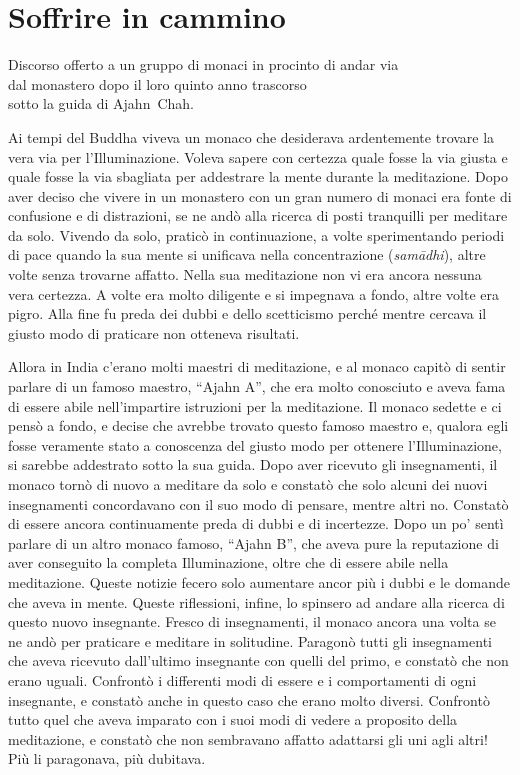 \chapter{Soffrire in cammino}

\begin{openingQuote}
  \centering

  Discorso offerto a un gruppo di monaci in procinto di andar via\\
  dal monastero dopo il loro quinto anno trascorso\\
  sotto la guida di Ajahn~Chah.
\end{openingQuote}

Ai tempi del Buddha viveva un monaco che desiderava ardentemente trovare
la vera via per l'Illuminazione. Voleva sapere con certezza quale fosse
la via giusta e quale fosse la via sbagliata per addestrare la mente
durante la meditazione. Dopo aver deciso che vivere in un monastero con
un gran numero di monaci era fonte di confusione e di distrazioni, se ne
andò alla ricerca di posti tranquilli per meditare da solo. Vivendo da
solo, praticò in continuazione, a volte sperimentando periodi di pace
quando la sua mente si unificava nella concentrazione (\emph{samādhi}),
altre volte senza trovarne affatto. Nella sua meditazione non vi era
ancora nessuna vera certezza. A volte era molto diligente e si impegnava
a fondo, altre volte era pigro. Alla fine fu preda dei dubbi e dello
scetticismo perché mentre cercava il giusto modo di praticare non
otteneva risultati.

Allora in India c'erano molti maestri di meditazione, e al monaco capitò
di sentir parlare di un famoso maestro, ``Ajahn A'', che era molto
conosciuto e aveva fama di essere abile nell'impartire istruzioni per la
meditazione. Il monaco sedette e ci pensò a fondo, e decise che avrebbe
trovato questo famoso maestro e, qualora egli fosse veramente stato a
conoscenza del giusto modo per ottenere l'Illuminazione, si sarebbe
addestrato sotto la sua guida. Dopo aver ricevuto gli insegnamenti, il
monaco tornò di nuovo a meditare da solo e constatò che solo alcuni dei
nuovi insegnamenti concordavano con il suo modo di pensare, mentre altri
no. Constatò di essere ancora continuamente preda di dubbi e di
incertezze. Dopo un po' sentì parlare di un altro monaco famoso, ``Ajahn
B'', che aveva pure la reputazione di aver conseguito la completa
Illuminazione, oltre che di essere abile nella meditazione. Queste
notizie fecero solo aumentare ancor più i dubbi e le domande che aveva
in mente. Queste riflessioni, infine, lo spinsero ad andare alla ricerca
di questo nuovo insegnante. Fresco di insegnamenti, il monaco ancora una
volta se ne andò per praticare e meditare in solitudine. Paragonò tutti
gli insegnamenti che aveva ricevuto dall'ultimo insegnante con quelli
del primo, e constatò che non erano uguali. Confrontò i differenti modi
di essere e i comportamenti di ogni insegnante, e constatò anche in
questo caso che erano molto diversi. Confrontò tutto quel che aveva
imparato con i suoi modi di vedere a proposito della meditazione, e
constatò che non sembravano affatto adattarsi gli uni agli altri! Più li
paragonava, più dubitava.

